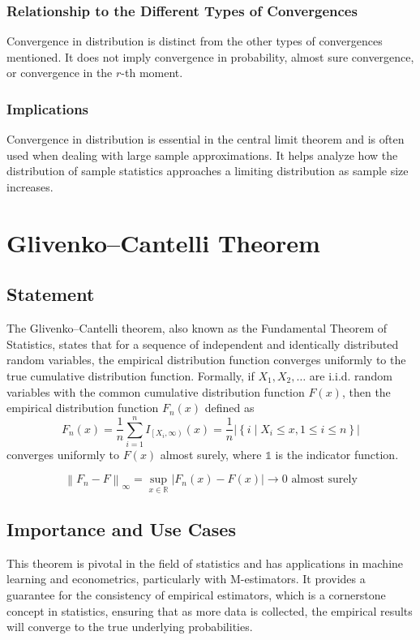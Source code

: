 \documentclass{article}
\begin{document}
\subsubsection{ Relationship to the Different Types of Convergences}
Convergence in distribution is distinct from the other types of convergences mentioned. It does not imply convergence in probability, almost sure convergence, or convergence in the \(r\)-th moment.

\subsubsection{ Implications}
Convergence in distribution is essential in the central limit theorem and is often used when dealing with large sample approximations. It helps analyze how the distribution of sample statistics approaches a limiting distribution as sample size increases.


\section{Glivenko–Cantelli Theorem}

\subsection{Statement}
The Glivenko–Cantelli theorem, also known as the Fundamental Theorem of Statistics, states that for a sequence of independent and identically distributed random variables, the empirical distribution function converges uniformly to the true cumulative distribution function. Formally, if \( X_1, X_2, \ldots \) are i.i.d. random variables with the common cumulative distribution function \( F(x) \), then the empirical distribution function \( F_n(x) \) defined as
$$
F_n(x)=\frac{1}{n} \sum_{i=1}^n I_{\left[X_i, \infty\right)}(x)=\frac{1}{n}\left|\left\{i \mid X_i \leq x, 1 \leq i \leq n\right\}\right|
$$
converges uniformly to \( F(x) \) almost surely, where \( \mathbb{1} \) is the indicator function.

 $$\left\|F_n-F\right\|_{\infty}=\sup _{x \in \mathbb{R}}\left|F_n(x)-F(x)\right| \longrightarrow 0 \text{ almost surely}$$

\subsection{Importance and Use Cases}
This theorem is pivotal in the field of statistics and has applications in machine learning and econometrics, particularly with M-estimators. It provides a guarantee for the consistency of empirical estimators, which is a cornerstone concept in statistics, ensuring that as more data is collected, the empirical results will converge to the true underlying probabilities.
\end{document}
